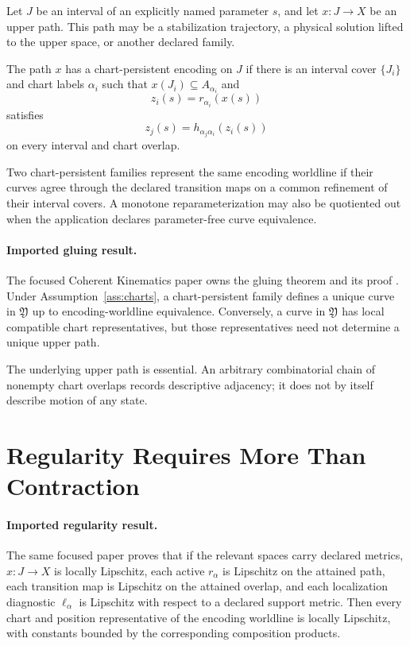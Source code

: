 \documentclass[11pt]{article}
\begin{document}
Let $J$ be an interval of an explicitly named parameter $s$, and let
$x:J\to X$ be an upper path. This path may be a stabilization trajectory, a
physical solution lifted to the upper space, or another declared family.

\begin{definition}
The path $x$ has a chart-persistent encoding on $J$ if there is an interval
cover $\{J_i\}$ and chart labels $\alpha_i$ such that
$x(J_i)\subseteq A_{\alpha_i}$ and
\[
 z_i(s)=r_{\alpha_i}(x(s))
\]
satisfies
\[
 z_j(s)=h_{\alpha_j\alpha_i}(z_i(s))
\]
on every interval and chart overlap.
\end{definition}

\begin{definition}
Two chart-persistent families represent the same encoding worldline if their
curves agree through the declared transition maps on a common refinement of
their interval covers. A monotone reparameterization may also be quotiented out
when the application declares parameter-free curve equivalence.
\end{definition}

\paragraph{Imported gluing result.}
The focused Coherent Kinematics paper owns the gluing theorem and its proof
\cite{CoherentKinematics}.  Under Assumption~\ref{ass:charts}, a
chart-persistent family defines a unique curve in $\mathfrak Y$ up to
encoding-worldline equivalence.  Conversely, a curve in $\mathfrak Y$ has
local compatible chart representatives, but those representatives need not
determine a unique upper path.

The underlying upper path is essential. An arbitrary combinatorial chain of
nonempty chart overlaps records descriptive adjacency; it does not by itself
describe motion of any state.

\section{Regularity Requires More Than Contraction}

\paragraph{Imported regularity result.}
The same focused paper proves that if the relevant spaces carry declared
metrics, $x:J\to X$ is locally
Lipschitz, each active $r_\alpha$ is Lipschitz on the attained path, each
transition map is Lipschitz on the attained overlap, and each localization
diagnostic $\ell_\alpha$ is Lipschitz with respect to a declared support
metric. Then every chart and position representative of the encoding
worldline is locally Lipschitz, with constants bounded by the corresponding
composition products.
\end{document}
